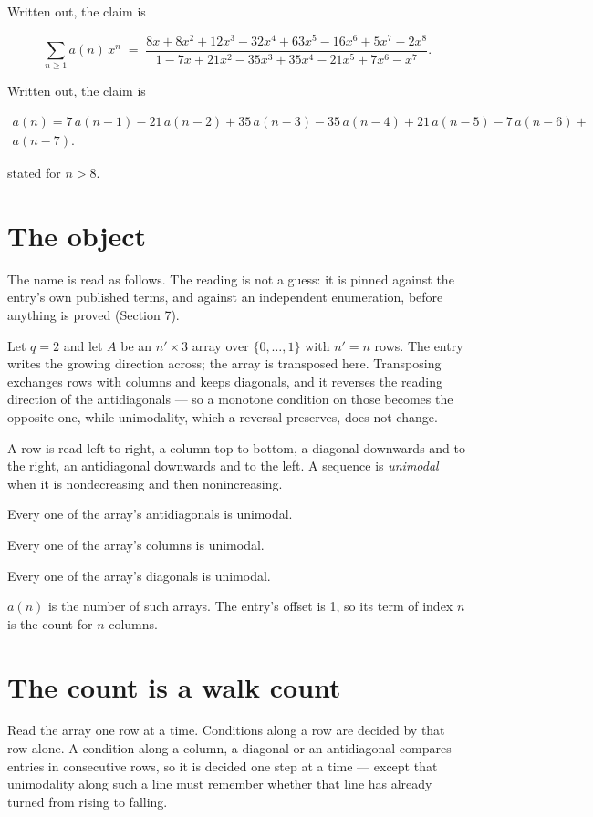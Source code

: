 \documentclass[11pt]{article}
\theoremstyle{definition}
\begin{document}
Written out, the claim is

\[\sum_{n \ge 1} a(n)\,x^n \;=\; \frac{8x + 8x^{2} + 12x^{3} - 32x^{4} + 63x^{5} - 16x^{6} + 5x^{7} - 2x^{8}}{1 - 7x + 21x^{2} - 35x^{3} + 35x^{4} - 21x^{5} + 7x^{6} - x^{7}}.\]

Written out, the claim is

\begin{multline*} a(n) = 7\,a(n-1) - 21\,a(n-2) + 35\,a(n-3) - 35\,a(n-4) + 21\,a(n-5) - 7\,a(n-6) + \\ a(n-7). \end{multline*}

stated for $n > 8$.

\section{The object}

The name is read as follows. The reading is not a guess: it is pinned against the entry's own published terms, and against an independent enumeration, before anything is proved (Section 7).

Let $q = 2$ and let $A$ be an $n' \times 3$ array over $\{0,\dots,1\}$ with $n' = n$ rows. The entry writes the growing direction across; the array is transposed here. Transposing exchanges rows with columns and keeps diagonals, and it reverses the reading direction of the antidiagonals --- so a monotone condition on those becomes the opposite one, while unimodality, which a reversal preserves, does not change.

A row is read left to right, a column top to bottom, a diagonal downwards and to the right, an antidiagonal downwards and to the left. A sequence is {\itshape unimodal} when it is nondecreasing and then nonincreasing.

Every one of the array's antidiagonals is unimodal.

Every one of the array's columns is unimodal.

Every one of the array's diagonals is unimodal.

$a(n)$ is the number of such arrays. The entry's offset is 1, so its term of index $n$ is the count for $n$ columns.

\section{The count is a walk count}

Read the array one row at a time. Conditions along a row are decided by that row alone. A condition along a column, a diagonal or an antidiagonal compares entries in consecutive rows, so it is decided one step at a time --- except that unimodality along such a line must remember whether that line has already turned from rising to falling.
\end{document}
